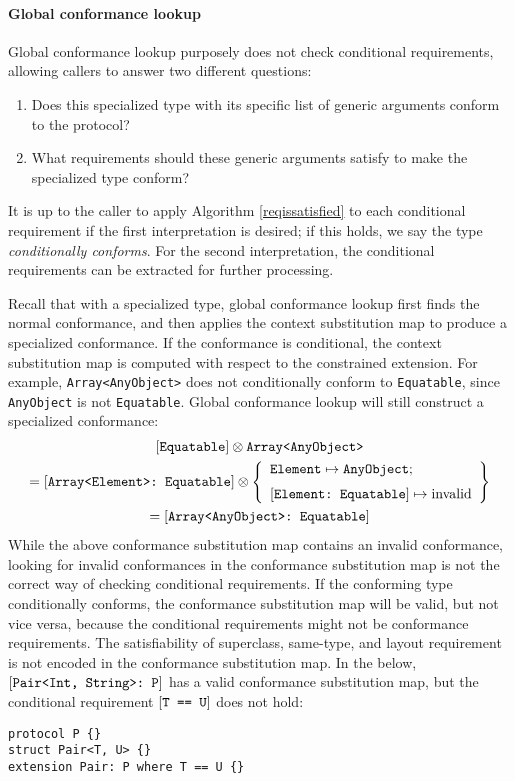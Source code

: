\documentclass[../generics]{subfiles}
\begin{document}
\paragraph{Global conformance lookup}
Global conformance lookup purposely does not check conditional requirements, allowing callers to answer two different questions:
\begin{enumerate}
\item Does this specialized type with its specific list of generic arguments conform to the protocol?
\item What requirements should these generic arguments satisfy to make the specialized type conform?
\end{enumerate}
It is up to the caller to apply Algorithm \ref{reqissatisfied} to each conditional requirement if the first interpretation is desired; if this holds, we say the type \emph{conditionally conforms}. For the second interpretation, the conditional requirements can be extracted for further processing.

Recall that with a specialized type, global conformance lookup first finds the normal conformance, and then applies the context substitution map to produce a specialized conformance. If the conformance is conditional, the context substitution map is computed with respect to the constrained extension. For example, \texttt{Array<AnyObject>} does not conditionally conform to \texttt{Equatable}, since \texttt{AnyObject} is not \texttt{Equatable}. Global conformance lookup will still construct a specialized conformance:
\begin{gather*}
\protosym{Equatable} \otimes \texttt{Array<AnyObject>}\\
= \ConfReq{Array<Element>}{Equatable} \otimes \SubstMapLongC{\SubstType{Element}{AnyObject}}{\ConfReq{Element}{Equatable}\mapsto\text{invalid}}\\
= \ConfReq{Array<AnyObject>}{Equatable}
\end{gather*}
While the above conformance substitution map contains an invalid conformance, looking for invalid conformances in the conformance substitution map is not the correct way of checking conditional requirements. If the conforming type conditionally conforms, the conformance substitution map will be valid, but not vice versa, because the conditional requirements might not be conformance requirements. The satisfiability of superclass, same-type, and layout requirement is not encoded in the conformance substitution map. In the below, $[\texttt{Pair<Int, String>:~P}]$ has a valid conformance substitution map, but the conditional requirement $[\texttt{T == U}]$ does not hold:
\begin{Verbatim}
protocol P {}
struct Pair<T, U> {}
extension Pair: P where T == U {}
\end{Verbatim}
\end{document}

